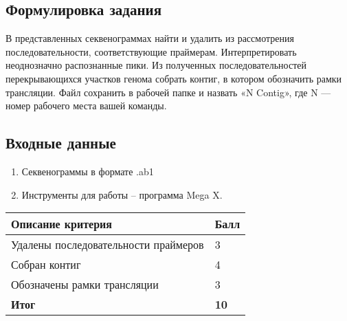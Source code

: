 
\subsection*{Формулировка задания}

В представленных секвенограммах найти и удалить из рассмотрения последовательности, соответствующие праймерам. Интерпретировать неоднозначно распознанные пики. Из полученных последовательностей перекрывающихся участков генома собрать контиг, в котором обозначить рамки трансляции. Файл сохранить в рабочей папке и назвать «N Contig», где N — номер рабочего места вашей команды.

\subsection*{Входные данные}

\begin{enumerate}
    \item Секвенограммы в формате .ab1 
    \item Инструменты для работы – программа Mega X.    
\end{enumerate}

\markSection

\begin{tabular}{|p{11cm}|p{3cm}|}
    \hline
    \textbf{Описание критерия} & \textbf{Балл} \\
    \hline
    Удалены последовательности праймеров & 3 \\
    \hline
    Собран контиг & 4 \\
    \hline
    Обозначены рамки трансляции & 3 \\
    \hline
    \hline
    \textbf{Итог} & \textbf{10} \\
    \hline
\end{tabular}